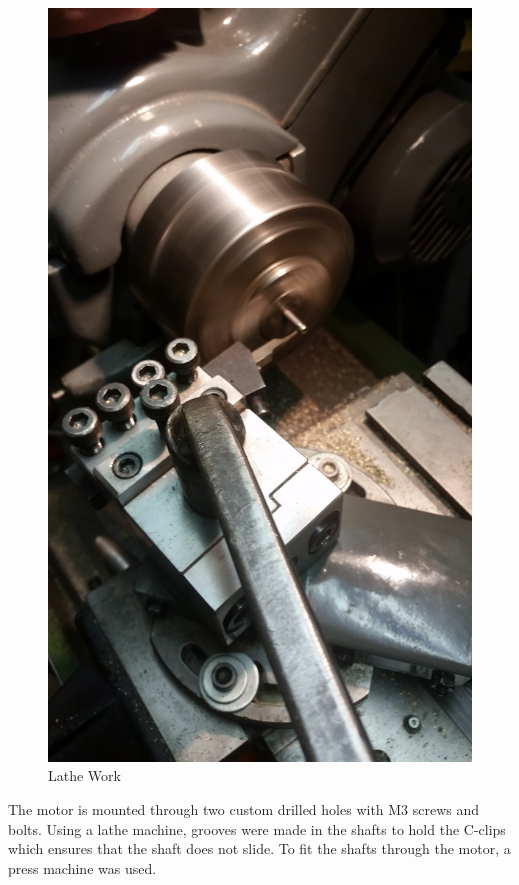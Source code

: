 \begin{figure}[H]
\begin{minipage}[b]{0.35\textwidth}
            \includegraphics[width = \textwidth, angle= 270]{VAPIQ-PICTURES/latheWork}
            \caption{Lathe Work}
        \end{minipage}
\end{figure}
\noindent
The motor is mounted through two custom drilled holes with M3 screws and bolts. Using a lathe machine, grooves were made in the shafts to hold the C-clips which ensures that the shaft does not slide. To fit the shafts through the motor, a press machine was used.

